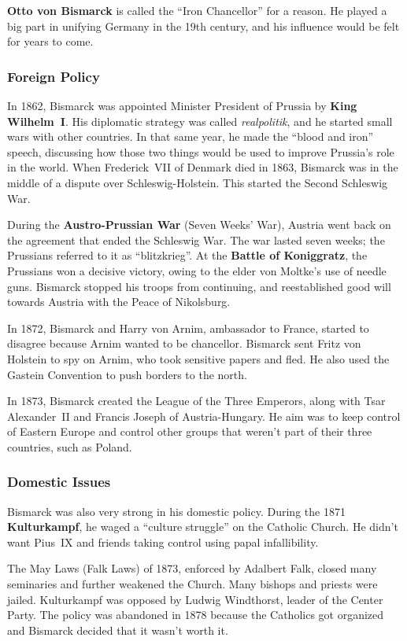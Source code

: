\textbf{Otto von Bismarck} is called the ``Iron Chancellor'' for a reason.
He played a big part in unifying Germany in the 19th century,
and his influence would be felt for years to come.

\subsubsection*{Foreign Policy}

In 1862, Bismarck was appointed Minister President of Prussia by \textbf{King Wilhelm~I}.
His diplomatic strategy was called \textit{realpolitik},
and he started small wars with other countries.
In that same year, he made the ``blood and iron'' speech,
discussing how those two things would be used to improve Prussia's role in the world.
When Frederick~VII of Denmark died in 1863,
Bismarck was in the middle of a dispute over Schleswig-Holstein.
This started the Second Schleswig War.

During the \textbf{Austro-Prussian War} (Seven Weeks' War),
Austria went back on the agreement that ended the Schleswig War.
The war lasted seven weeks; the Prussians referred to it as ``blitzkrieg''.
At the \textbf{Battle of Koniggratz}, the Prussians won a decisive victory,
owing to the elder von Moltke's use of needle guns.
Bismarck stopped his troops from continuing,
and reestablished good will towards Austria with the Peace of Nikolsburg.

In 1872, Bismarck and Harry von Arnim, ambassador to France,
started to disagree because Arnim wanted to be chancellor.
Bismarck sent Fritz von Holstein to spy on Arnim, who took sensitive papers and fled.
He also used the Gastein Convention to push borders to the north.

In 1873, Bismarck created the League of the Three Emperors,
along with Tsar Alexander~II and Francis Joseph of Austria-Hungary.
He aim was to keep control of Eastern Europe
and control other groups that weren't part of their three countries,
such as Poland.

\subsubsection*{Domestic Issues}

Bismarck was also very strong in his domestic policy.
During the 1871 \textbf{Kulturkampf}, he waged a ``culture struggle'' on the Catholic Church.
He didn't want Pius~IX and friends taking control using papal infallibility.

The May Laws (Falk Laws) of 1873, enforced by Adalbert Falk,
closed many seminaries and further weakened the Church.
Many bishops and priests were jailed.
Kulturkampf was opposed by Ludwig Windthorst, leader of the Center Party.
The policy was abandoned in 1878
because the Catholics got organized and Bismarck decided that it wasn't worth it.

